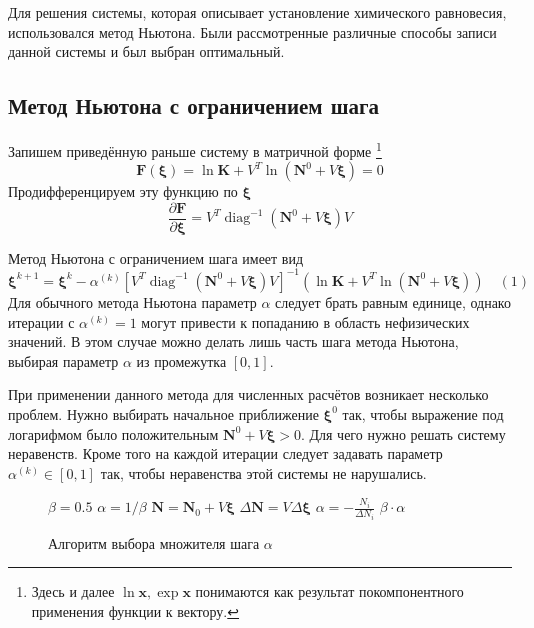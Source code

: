 \documentclass[14pt,a4paper]{extarticle}
\newcounter{algorithmic}
\newenvironment{myalgorithmic}[1][0]{\stepcounter{algorithmic}\begin{algorithmic}[#1]}{\end{algorithmic}}
\newcommand{\diag}{\operatorname{diag}}
\renewcommand{\vec}[1]{\boldsymbol{\mathbf{#1}}}
\begin{document}
Для решения системы, которая описывает установление химического равновесия, использовался метод Ньютона. Были рассмотренные различные способы записи данной системы и был выбран оптимальный.

\subsection{Метод Ньютона с ограничением шага}

Запишем приведённую раньше систему в матричной форме
\footnote{Здесь и далее $\ln \vec x, \exp \vec x$ понимаются как результат покомпонентного применения функции к вектору.}
$$\vec{F}(\vec \xi) = \ln{\vec{K}} + V^T \ln{(\vec{N}^0 + V\vec \xi)} = 0$$
Продифференцируем эту функцию по $\vec \xi$
$$\frac{\partial \vec{F}}{\partial{\vec{\xi}}} = V^T\diag^{-1}(\vec{N}^0 + V\vec{\xi})V$$

Метод Ньютона с ограничением шага \cite{kalit} имеет вид
$$\vec{\xi}^{k+1} = \vec{\xi}^{k} - \alpha^{(k)}[V^T\diag^{-1}(\vec{N}^0 + V\vec{\xi})V]^{-1}(\ln{\vec{K}} + V^T \ln{(\vec{N}^0 + V\vec{\xi})}) \quad (1)$$
Для обычного метода Ньютона параметр $\alpha$ следует брать равным единице, однако итерации с $\alpha^{(k)} = 1$ могут привести к попаданию в область нефизических значений. В этом случае можно делать лишь часть шага метода Ньютона, выбирая параметр $\alpha$ из промежутка $[0, 1]$.   

При применении данного метода для численных расчётов возникает несколько проблем. Нужно выбирать начальное приближение $\vec{\xi}^0$ так, чтобы выражение под логарифмом было положительным $\vec{N}^0 + V\vec{\xi} > 0$. Для чего нужно решать систему неравенств. Кроме того на каждой итерации следует задавать параметр $\alpha^{(k)} \in [0,1]$ так, чтобы неравенства этой системы не нарушались.  
\begin{figure}[!h]
\begin{myalgorithmic}[1]
\Function{ChooseAlpha}{$\vec N_0, V, \vec \xi,\Delta \vec \xi$}
\State $\beta = 0.5$ 
\State $\alpha = 1 / \beta$
\State $\vec N = \vec N_0 + V \vec \xi$ 
\State $\Delta \vec N = V \Delta \vec \xi$ 
\State $\alpha = -\frac{N_i}{\Delta N_i}$ 
\EndIf
\EndFor
\State \Return $\beta \cdot \alpha$
\EndFunction
\end{myalgorithmic}
\caption{Алгоритм выбора множителя шага $\alpha$}
\end{figure}
\end{document}
